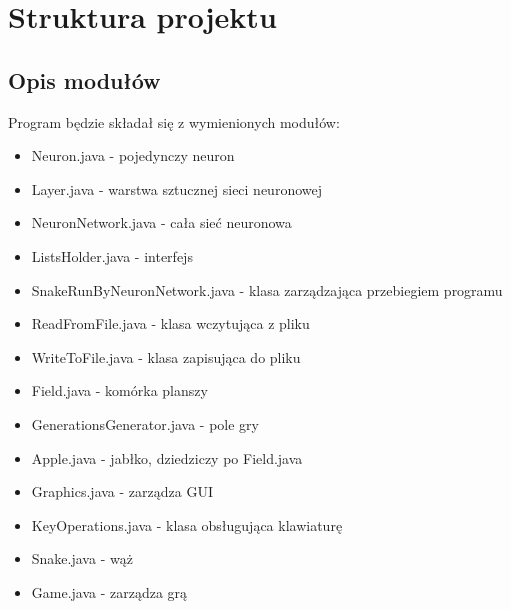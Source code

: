\documentclass[12pt]{article}
\begin{document}
	\section {Struktura projektu}
		\subsection {Opis modułów}
			Program będzie składał się z wymienionych modułów:
			\begin{itemize}
				\item Neuron.java - pojedynczy neuron
				\item Layer.java - warstwa sztucznej sieci neuronowej
				\item NeuronNetwork.java - cała sieć neuronowa
				\item ListsHolder.java - interfejs
				\item SnakeRunByNeuronNetwork.java - klasa zarządzająca przebiegiem programu
				\item ReadFromFile.java - klasa wczytująca z pliku
				\item WriteToFile.java - klasa zapisująca do pliku
				\item Field.java - komórka planszy
				\item GenerationsGenerator.java - pole gry
				\item Apple.java - jabłko, dziedziczy po Field.java
				\item Graphics.java - zarządza GUI
				\item KeyOperations.java - klasa obsługująca klawiaturę
				\item Snake.java - wąż
				\item Game.java - zarządza grą			
			\end{itemize}
\end{document}
